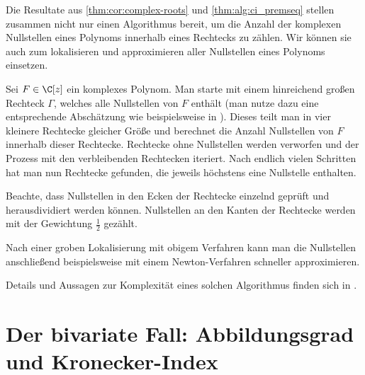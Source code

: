 \documentclass{mythesis}
\begin{document}
\begin{remark}
    Die Resultate aus \ref{thm:cor:complex-roots} und \ref{thm:alg:ci_premseq} stellen zusammen nicht nur einen Algorithmus bereit, um die Anzahl der komplexen Nullstellen eines Polynoms innerhalb eines Rechtecks zu zählen.
    Wir können sie auch zum lokalisieren und approximieren aller Nullstellen eines Polynoms einsetzen.

    Sei $F \in \C[z]$ ein komplexes Polynom.
    Man starte mit einem hinreichend großen Rechteck $\Gamma$, welches alle Nullstellen von $F$ enthält (man nutze dazu eine entsprechende Abschätzung wie beispielsweise in \cite[Proposition 5.8]{eisermann2012fundamental}).
    Dieses teilt man in vier kleinere Rechtecke gleicher Größe und berechnet die Anzahl Nullstellen von $F$ innerhalb dieser Rechtecke.
    Rechtecke ohne Nullstellen werden verworfen und der Prozess mit den verbleibenden Rechtecken iteriert.
    Nach endlich vielen Schritten hat man nun Rechtecke gefunden, die jeweils höchstens eine Nullstelle enthalten.

    Beachte, dass Nullstellen in den Ecken der Rechtecke einzelnd geprüft und herausdividiert werden können.
    Nullstellen an den Kanten der Rechtecke werden mit der Gewichtung $\frac{1}{2}$ gezählt.

    Nach einer groben Lokalisierung mit obigem Verfahren kann man die Nullstellen anschließend beispielsweise mit einem Newton-Verfahren schneller approximieren.

    Details und Aussagen zur Komplexität eines solchen Algorithmus finden sich in \cite[§6.3~--~§6.10]{eisermann2012fundamental}.
\end{remark}











\clearpage

\chapter{Der bivariate Fall: Abbildungsgrad und Kronecker-Index} \label{sec:2}
\end{document}
